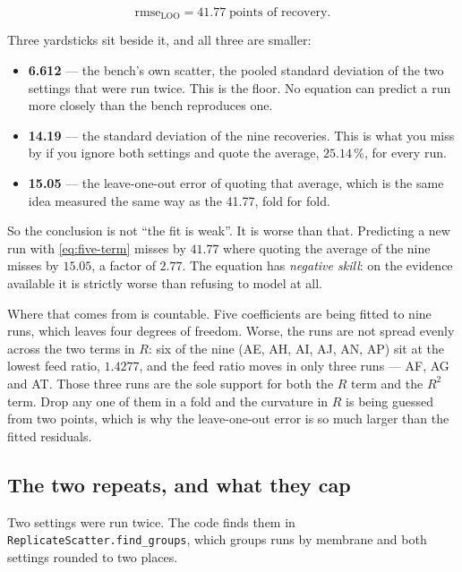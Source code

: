 \begin{equation}
  \text{rmse}_{\text{LOO}} = 41.77 \;\text{points of recovery}.
\end{equation}

Three yardsticks sit beside it, and all three are smaller:

\begin{itemize}[leftmargin=1.4em]
  \item \textbf{6.612} --- the bench's own scatter, the pooled standard deviation of the two
    settings that were run twice. This is the floor. No equation can predict a run more closely
    than the bench reproduces one.
  \item \textbf{14.19} --- the standard deviation of the nine recoveries. This is what you miss
    by if you ignore both settings and quote the average, $25.14\,\%$, for every run.
  \item \textbf{15.05} --- the leave-one-out error of quoting that average, which is the same
    idea measured the same way as the 41.77, fold for fold.
\end{itemize}

So the conclusion is not ``the fit is weak''. It is worse than that. Predicting a new run with
\eqref{eq:five-term} misses by $41.77$ where quoting the average of the nine misses by $15.05$,
a factor of $2.77$. The equation has \emph{negative skill}: on the evidence available it is
strictly worse than refusing to model at all.

Where that comes from is countable. Five coefficients are being fitted to nine runs, which
leaves four degrees of freedom. Worse, the runs are not spread evenly across the two terms in
$R$: six of the nine (AE, AH, AI, AJ, AN, AP) sit at the lowest feed ratio, $1.4277$, and the
feed ratio moves in only three runs --- AF, AG and AT. Those three runs are the sole support for
both the $R$ term and the $R^{2}$ term. Drop any one of them in a fold and the curvature in $R$
is being guessed from two points, which is why the leave-one-out error is so much larger than
the fitted residuals.

\subsection{The two repeats, and what they cap}

Two settings were run twice. The code finds them in
\texttt{ReplicateScatter\allowbreak{}.find\_groups}, which groups runs by membrane and both
settings rounded to two places.

